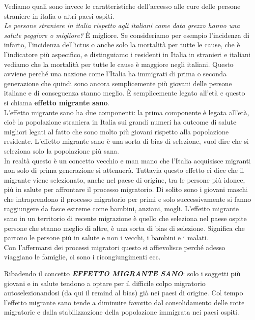 \documentclass[]{article}
\begin{document}
Vediamo quali sono invece le caratteristiche dell'accesso alle cure
delle persone straniere in italia o altri paesi ospiti.\\
\emph{Le persone straniere in italia rispetto agli italiani come dato
grezzo hanno una salute peggiore o migliore?} È migliore. Se
consideriamo per esempio l'incidenza di infarto, l'incidenza dell'ictus
o anche solo la mortalità per tutte le cause, che è l'indicatore più
aspecifico, e distinguiamo i residenti in Italia in stranieri e italiani
vediamo che la mortalità per tutte le cause è maggiore negli italiani.
Questo avviene perché una nazione come l'Italia ha immigrati di prima o
seconda generazione che quindi sono ancora semplicemente più giovani
delle persone italiane e di conseguenza stanno meglio. È semplicemente
legato all'età e questo si chiama \textbf{effetto migrante sano}.\\
L'effetto migrante sano ha due componenti: la prima componente è legata
all'età, cioè la popolazione straniera in Italia sui grandi numeri ha
outcome di salute migliori legati al fatto che sono molto più giovani
rispetto alla popolazione residente. L'effetto migrante sano è una sorta
di bias di selezione, vuol dire che si seleziona solo la popolazione più
sana.\\
In realtà questo è un concetto vecchio e man mano che l'Italia
acquisisce migranti non solo di prima generazione si attenuerà. Tuttavia
questo effetto ci dice che il migrante viene selezionato, anche nel
paese di origine, tra le persone più idonee, più in salute per
affrontare il processo migratorio. Di solito sono i giovani maschi che
intraprendono il processo migratorio per primi e solo successivamente si
fanno raggiungere da fasce estreme come bambini, anziani, mogli.
L'effetto migrante sano in un territorio di recente migrazione è quello
che seleziona nel paese ospite persone che stanno meglio di altre, è una
sorta di bias di selezione. Significa che partono le persone più in
salute e non i vecchi, i bambini e i malati.\\
Con l'affermarsi dei processi migratori questo si affievolisce perché
adesso viaggiano le famiglie, ci sono i ricongiungimenti ecc.

Ribadendo il concetto \textbf{\emph{EFFETTO MIGRANTE SANO}}: solo i
soggetti più giovani e in salute tendono a optare per il difficile colpo
migratorio autoselezionandosi (da qui il remind al bias) già nei paesi
di origine. Col tempo l'effetto migrante sano tende a diminuire favorito
dal consolidamento delle rotte migratorie e dalla stabilizzazione della
popolazione immigrata nei paesi ospiti.
\end{document}
